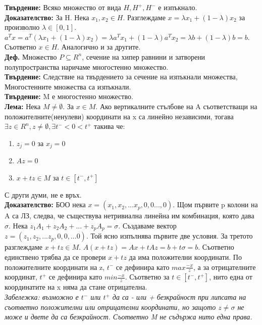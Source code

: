 \documentclass[12pt, a4paper]{article}
\begin{document}
\textbf{Твърдение:} Всяко множество от вида $H,H^+,H^-$ е изпъкнало.\\
\textbf{Доказателство:} За H. Нека $x_1, x_2 \in H$. Разглеждаме $x=\lambda x_1 + (1-\lambda)x_2$ за произволно $\lambda \in [0,1]$. $a^Tx=a^T(\lambda x_1 + (1-\lambda)x_2) = \lambda a^Tx_1 + (1-\lambda)a^Tx_2 = \lambda b + (1-\lambda)b = b.$ Съответно $x \in H$. Аналогично и за другите.\\

\textbf{Деф.} Множество $P\subseteq R^n$, сечение на хипер равнини и затворени полупространства наричаме многостенно множество.\\

\textbf{Твърдение:} Следствие на твърдението за сечение на изпъкнали множества, Многостенните множества са изпъкнали.\\

\textbf{Твърдение:} M е многостенно множество.\\

\textbf{Лема:} Нека $M \ne \emptyset$. За $x \in M$. Ако вертикалните стълбове на A съответстващи на положителните(ненулеви) координати на x са линейно независими, тогава $\exists z\in R^n, z\ne\emptyset,\exists t^-<0<t^+$ такива че:\\
\begin{enumerate}
	\item $z_j = 0$ за $x_j = 0$
	\item $Az=0$
	\item $x+tz\in M$ за $t\in[t^-,t^+]$
\end{enumerate}
С други думи, не е връх.\\
\textbf{Доказателство:} БОО нека $x = (x_1, x_2, ... x_p, 0, 0..., 0)$. Щом първите p колони на A са ЛЗ, следва, че съществува нетривиална линейна им комбинация, която дава $\sigma$. Нека $z_1A_1 + z_2A_2 + ... +z_pA_p = \sigma$. Създаваме вектор $z=(z_1, z_2, ... z_p, 0, 0, ... 0)$. Той ясно изпълнява първите две условия. За третото разглеждаме $x+tz\in M$. $A(x+tz) = Ax+tAz = b+t\sigma=b$. Съответно единствено трябва да се провери $x+tz$ да има положителни координати. По положителните координати на z, $t^-$ се дефинира като $max \frac{-x}{z}$, а за отрицателните координат, $t^+$ се дефинира като $min \frac{-x}{z}$. Съответно за $t\in[t^-, t^+]$, нито една от координатите на x няма да стане отрицателна.\\
\textit{Забележка: възможно е $t^-$ или $t^+$ да са - или + безкрайност при липсата на съответно положителни или отрицателни координати, но защото $z\ne\sigma$ не може и двете да са безкрайност. Съответно M не съдържа нито една права.}\\
\end{document}
